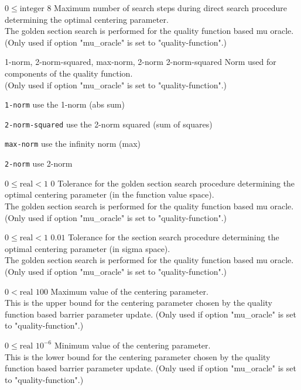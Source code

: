 %
{$0\leq\textrm{integer}$}%
{$8$}%
{Maximum number of search steps during direct search procedure determining the optimal centering parameter.\\
The golden section search is performed for the quality function based mu oracle. (Only used if option "mu\_oracle" is set to "quality-function".)}%
{}

%
{1-norm, 2-norm-squared, max-norm, 2-norm}%
{2-norm-squared}%
{Norm used for components of the quality function.\\
(Only used if option "mu\_oracle" is set to "quality-function".)}%
{\begin{list}{}{
\setlength{\parsep}{0em}
\setlength{\leftmargin}{5ex}
\setlength{\labelwidth}{2ex}
\setlength{\itemindent}{0ex}
\setlength{\topsep}{0pt}}
\item[\texttt{1-norm}] use the 1-norm (abs sum)
\item[\texttt{2-norm-squared}] use the 2-norm squared (sum of squares)
\item[\texttt{max-norm}] use the infinity norm (max)
\item[\texttt{2-norm}] use 2-norm
\end{list}
}

%
{$0\leq\textrm{real}<1$}%
{$0$}%
{Tolerance for the golden section search procedure determining the optimal centering parameter (in the function value space).\\
The golden section search is performed for the quality function based mu oracle. (Only used if option "mu\_oracle" is set to "quality-function".)}%
{}

%
{$0\leq\textrm{real}<1$}%
{$0.01$}%
{Tolerance for the section search procedure determining the optimal centering parameter (in sigma space).\\
The golden section search is performed for the quality function based mu oracle. (Only used if option "mu\_oracle" is set to "quality-function".)}%
{}

%
{$0<\textrm{real}$}%
{$100$}%
{Maximum value of the centering parameter.\\
This is the upper bound for the centering parameter chosen by the quality function based barrier parameter update. (Only used if option "mu\_oracle" is set to "quality-function".)}%
{}

%
{$0\leq\textrm{real}$}%
{$10^{- 6}$}%
{Minimum value of the centering parameter.\\
This is the lower bound for the centering parameter chosen by the quality function based barrier parameter update. (Only used if option "mu\_oracle" is set to "quality-function".)}%
{}

